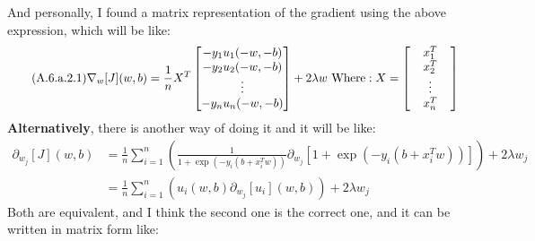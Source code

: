 \documentclass[]{article}
\begin{document}
        And personally, I found a matrix representation of the gradient using the above expression, which will be like: 
        \begin{align*}\tag{A.6.a.2.1}\label{eqn:A.6.a.2.1}
            \nabla_w[J](w, b) = 
            \frac{1}{n}X^T \begin{bmatrix}
                -y_1 u_1(-w, -b) 
                \\
                -y_2u_2(-w, -b) 
                \\
                \vdots
                \\
                -y_n u_n(-w, -b) 
            \end{bmatrix} + 2\lambda w 
            \text{ Where}: 
            X = \begin{bmatrix}
                \hspace{1.1em} x_1^T \hspace{1.1em} \\ \hspace{1.1em} x_2^T \hspace{1.1em} \\ \vdots \\ \hspace{1.1em} x_n^T \hspace{1.1em}
            \end{bmatrix}
        \end{align*}
        \textbf{Alternatively}, there is another way of doing it and it will be like: 
        \begin{align*}\tag{A.6.a.3}\label{eqn:A.6.a.3}
            \partial_{w_j}[J](w, b) &=  \frac{1}{n} \sum_{i = 1}^{n}
            \left(
                \frac{1}{1 + \exp(-y_i(b + x^T_iw))}
                \partial_{w_j}
                \left[
                    1 + \exp(-y_i(b + x^T_iw))
                \right]
            \right)
            + 2\lambda w_j
            \\
            &= 
            \frac{1}{n} \sum_{i = 1}^{n}
            \left(
                u_i(w, b)
                \partial_{w_j}
                \left[
                    u_i
                \right](w, b)
            \right)
            + 2\lambda w_j
        \end{align*}
        Both are equivalent, and I think the second one is the correct one, and it can be written in matrix form like: 
\end{document}
